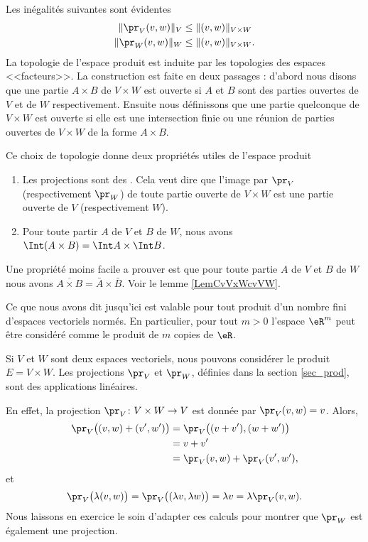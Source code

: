 Les inégalités suivantes sont évidentes
\begin{equation}
	\begin{aligned}[]
		\|\pr_V(v,w)\|_V&\leq \|(v,w)\|_{V\times W} \\
		\|\pr_W(v,w)\|_W&\leq \|(v,w)\|_{V\times W}.
	\end{aligned}
\end{equation}
La topologie de l'espace produit est induite par les topologies des espaces <<facteurs>>. La construction est faite en deux passages : d'abord nous disons que une partie $A\times B$ de $V\times W$ est ouverte si $A$ et $B$ sont des parties ouvertes de $V$ et de $W$ respectivement.  Ensuite nous définissons que une partie quelconque de $V\times W$ est ouverte si elle est une intersection finie ou une réunion de parties ouvertes de $V\times W$ de la forme $A\times B$. 

Ce choix de topologie donne deux propriétés utiles de l'espace produit 
\begin{enumerate}
	\item
		Les projections sont des . Cela veut dire que l'image par $\pr_V$ (respectivement $\pr_W$) de toute partie ouverte de $V\times W$ est une partie ouverte de $V$ (respectivement $W$). 
	\item 
		Pour toute partir $A$ de $V$ et $B$ de $W$, nous avons $\Int (A\times B)=\Int A\times \Int B$.\label{PgovlABeqbAbB}
\end{enumerate}
Une propriété moins facile a prouver est que pour toute partie $A$ de $V$ et $B$ de $W$ nous avons  $\overline{A\times B}=\bar{A}\times \bar{B}$. Voir le lemme \ref{LemCvVxWcvVW}.
  
Ce que nous avons dit jusqu'ici est valable pour tout produit d'un nombre fini d'espaces vectoriels normés. En particulier, pour tout $m>0$  l'espace  $\eR^m$ peut être considéré comme le produit de $m$ copies de $\eR$. 

\begin{example}
	Si $V$ et $W$ sont deux espaces vectoriels, nous pouvons considérer le produit $E=V\times W$. Les projections $\pr_V$ et $\pr_W$, définies dans la section \ref{sec_prod}, sont des applications linéaires. 

	En effet, la projection $\pr_V\colon V\times W\to V$ est donnée par $\pr_V(v,w)=v$. Alors,
	\begin{equation}
		\begin{aligned}[]
			\pr_V\big( (v,w)+(v',w') \big)&=\pr_V\big( (v+v'),(w+w') \big)\\
			&=v+v'\\
			&=\pr_V(v,w)+\pr_V(v',w'),
		\end{aligned}
	\end{equation}
	et
	\begin{equation}
		\pr_V\big( \lambda(v,w) \big)=\pr_V\big( (\lambda v,\lambda w) \big)=\lambda v=\lambda\pr_V(v,w).
	\end{equation}
	Nous laissons en exercice le soin d'adapter ces calculs pour montrer que $\pr_W$ est également une projection.
\end{example}

